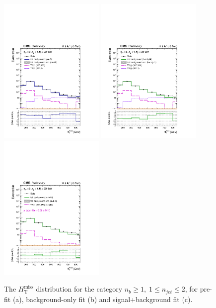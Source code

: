 \clearpage
\begin{figure}[tbhp]
    \caption{ 
    The $H_{\mathrm{T}}^{\mathrm{miss}}$ distribution for the category $n_{b}\geq1, \; 1 \leq n_{jet} \leq 2$, for pre-fit (a), background-only fit (b) and signal+background fit (c).
    \label{fig:mhtShape_ge1b_le2j} }
  \begin{center}
  \includegraphics[width=0.45\textwidth]{mhtShape_ge1b_le2j_200_Inf_prefit_aux} \hspace{1cm}
  \includegraphics[width=0.45\textwidth]{mhtShape_ge1b_le2j_200_Inf_fit_b_aux} \\
  \includegraphics[width=0.45\textwidth]{mhtShape_ge1b_le2j_200_Inf_fit_s_aux}
  \end{center}
\end{figure}


